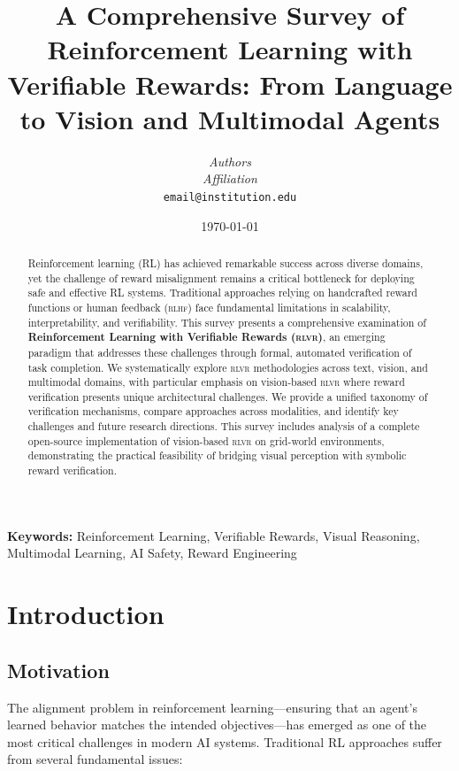 \documentclass[11pt,a4paper]{article}
\title{\textbf{A Comprehensive Survey of Reinforcement Learning with Verifiable Rewards: From Language to Vision and Multimodal Agents}}
\author{
    \textit{Authors}\\
    \textit{Affiliation}\\
    \texttt{email@institution.edu}
}
\date{\today}
\newcommand{\rlvr}{\textsc{rlvr}}
\newcommand{\rlhf}{\textsc{rlhf}}
\begin{document}
\maketitle

\begin{abstract}
Reinforcement learning (RL) has achieved remarkable success across diverse domains, yet the challenge of reward misalignment remains a critical bottleneck for deploying safe and effective RL systems. Traditional approaches relying on handcrafted reward functions or human feedback (\rlhf{}) face fundamental limitations in scalability, interpretability, and verifiability. This survey presents a comprehensive examination of \textbf{Reinforcement Learning with Verifiable Rewards (\rlvr{})}, an emerging paradigm that addresses these challenges through formal, automated verification of task completion. We systematically explore \rlvr{} methodologies across text, vision, and multimodal domains, with particular emphasis on vision-based \rlvr{} where reward verification presents unique architectural challenges. We provide a unified taxonomy of verification mechanisms, compare approaches across modalities, and identify key challenges and future research directions. This survey includes analysis of a complete open-source implementation of vision-based \rlvr{} on grid-world environments, demonstrating the practical feasibility of bridging visual perception with symbolic reward verification.
\end{abstract}

\noindent\textbf{Keywords:} Reinforcement Learning, Verifiable Rewards, Visual Reasoning, Multimodal Learning, AI Safety, Reward Engineering

\tableofcontents
\newpage

\section{Introduction}
\label{sec:introduction}

\subsection{Motivation}
\label{sec:motivation}

The alignment problem in reinforcement learning---ensuring that an agent's learned behavior matches the intended objectives---has emerged as one of the most critical challenges in modern AI systems. Traditional RL approaches suffer from several fundamental issues:
\end{document}
